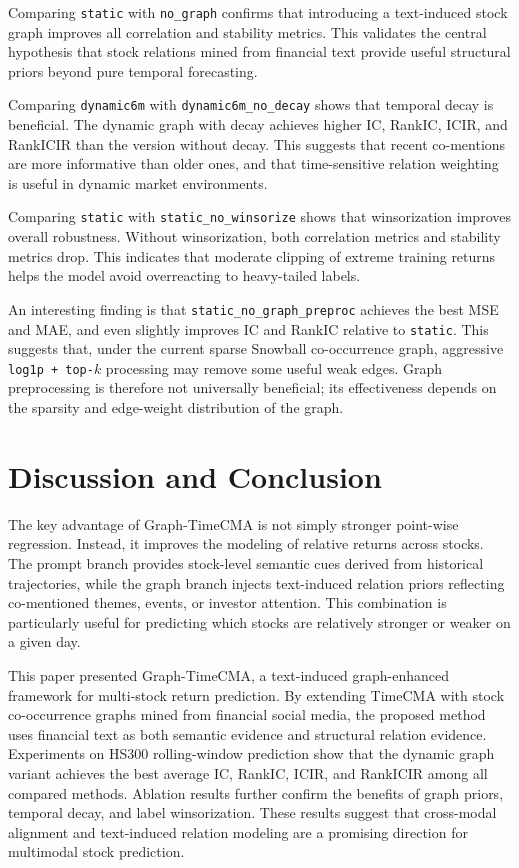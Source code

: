 \documentclass[runningheads]{llncs}
\begin{document}
Comparing \texttt{static} with \texttt{no\_graph} confirms that introducing a text-induced stock graph improves all correlation and stability metrics. This validates the central hypothesis that stock relations mined from financial text provide useful structural priors beyond pure temporal forecasting.

Comparing \texttt{dynamic6m} with \texttt{dynamic6m\_no\_decay} shows that temporal decay is beneficial. The dynamic graph with decay achieves higher IC, RankIC, ICIR, and RankICIR than the version without decay. This suggests that recent co-mentions are more informative than older ones, and that time-sensitive relation weighting is useful in dynamic market environments.

Comparing \texttt{static} with \texttt{static\_no\_winsorize} shows that winsorization improves overall robustness. Without winsorization, both correlation metrics and stability metrics drop. This indicates that moderate clipping of extreme training returns helps the model avoid overreacting to heavy-tailed labels.

An interesting finding is that \texttt{static\_no\_graph\_preproc} achieves the best MSE and MAE, and even slightly improves IC and RankIC relative to \texttt{static}. This suggests that, under the current sparse Snowball co-occurrence graph, aggressive \texttt{log1p + top-$k$} processing may remove some useful weak edges. Graph preprocessing is therefore not universally beneficial; its effectiveness depends on the sparsity and edge-weight distribution of the graph.

\section{Discussion and Conclusion}

The key advantage of Graph-TimeCMA is not simply stronger point-wise regression. Instead, it improves the modeling of relative returns across stocks. The prompt branch provides stock-level semantic cues derived from historical trajectories, while the graph branch injects text-induced relation priors reflecting co-mentioned themes, events, or investor attention. This combination is particularly useful for predicting which stocks are relatively stronger or weaker on a given day.

This paper presented Graph-TimeCMA, a text-induced graph-enhanced framework for multi-stock return prediction. By extending TimeCMA with stock co-occurrence graphs mined from financial social media, the proposed method uses financial text as both semantic evidence and structural relation evidence. Experiments on HS300 rolling-window prediction show that the dynamic graph variant achieves the best average IC, RankIC, ICIR, and RankICIR among all compared methods. Ablation results further confirm the benefits of graph priors, temporal decay, and label winsorization. These results suggest that cross-modal alignment and text-induced relation modeling are a promising direction for multimodal stock prediction.



\end{document}
